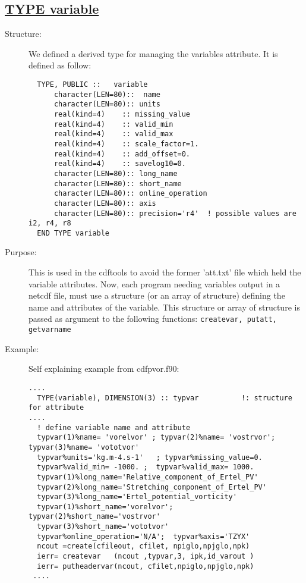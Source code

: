 \documentclass[a4paper,11pt]{article}
\begin{document}
\subsection*{\underline{ TYPE variable}}
\begin{description}
\item[Structure:]  We defined a derived type for managing the variables attribute. It is defined as follow:
\begin{small}
\begin{verbatim}
  TYPE, PUBLIC ::   variable
      character(LEN=80)::  name
      character(LEN=80):: units
      real(kind=4)    :: missing_value
      real(kind=4)    :: valid_min
      real(kind=4)    :: valid_max
      real(kind=4)    :: scale_factor=1.
      real(kind=4)    :: add_offset=0.
      real(kind=4)    :: savelog10=0.
      character(LEN=80):: long_name
      character(LEN=80):: short_name
      character(LEN=80):: online_operation
      character(LEN=80):: axis
      character(LEN=80):: precision='r4'  ! possible values are i2, r4, r8
  END TYPE variable
\end{verbatim}
\end{small}
\item[Purpose:] This is used in the cdftools to avoid the former 'att.txt' file which held the variable attributes. Now, each
   program needing variables output in a netcdf file, must use a structure (or an array of structure) defining the name and attributes
   of the variable. This structure or array of structure is passed as argument to the following functions: {\tt createvar, putatt, getvarname}
\item[Example:] Self explaining example from cdfpvor.f90:
\begin{small}
\begin{verbatim}
....
  TYPE(variable), DIMENSION(3) :: typvar          !: structure for attribute
....
  ! define variable name and attribute
  typvar(1)%name= 'vorelvor' ; typvar(2)%name= 'vostrvor';  typvar(3)%name= 'vototvor'
  typvar%units='kg.m-4.s-1'   ; typvar%missing_value=0.  
  typvar%valid_min= -1000. ;  typvar%valid_max= 1000.
  typvar(1)%long_name='Relative_component_of_Ertel_PV'  
  typvar(2)%long_name='Stretching_component_of_Ertel_PV' 
  typvar(3)%long_name='Ertel_potential_vorticity'  
  typvar(1)%short_name='vorelvor';  typvar(2)%short_name='vostrvor'
  typvar(3)%short_name='vototvor'
  typvar%online_operation='N/A';  typvar%axis='TZYX'
  ncout =create(cfileout, cfilet, npiglo,npjglo,npk)
  ierr= createvar   (ncout ,typvar,3, ipk,id_varout )
  ierr= putheadervar(ncout, cfilet,npiglo,npjglo,npk)
 ....
\end{verbatim}
\end{small}
\end{description}
\end{document}

